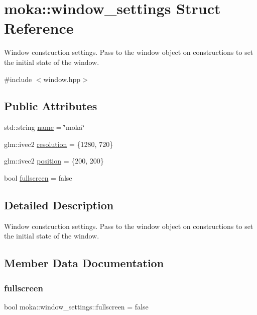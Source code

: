 \hypertarget{structmoka_1_1window__settings}{}\section{moka\+::window\+\_\+settings Struct Reference}
\label{structmoka_1_1window__settings}


Window construction settings. Pass to the window object on constructions to set the initial state of the window.  




{\ttfamily \#include $<$window.\+hpp$>$}

\subsection*{Public Attributes}
\begin{DoxyCompactItemize}
\item 
std\+::string \mbox{\hyperlink{structmoka_1_1window__settings_ad53068092b1bf791a0dfe35df846026b}{name}} = \char`\"{}moka\char`\"{}
\item 
glm\+::ivec2 \mbox{\hyperlink{structmoka_1_1window__settings_a660037db2bab0e3a2cbdf0ac65832096}{resolution}} = \{1280, 720\}
\item 
glm\+::ivec2 \mbox{\hyperlink{structmoka_1_1window__settings_a67d1e29d6707e634ee248f56edf1c2dc}{position}} = \{200, 200\}
\item 
bool \mbox{\hyperlink{structmoka_1_1window__settings_a1dbb508a1648c609d6d4f0d700f611bd}{fullscreen}} = false
\end{DoxyCompactItemize}


\subsection{Detailed Description}
Window construction settings. Pass to the window object on constructions to set the initial state of the window. 

\subsection{Member Data Documentation}
\mbox{\label{structmoka_1_1window__settings_a1dbb508a1648c609d6d4f0d700f611bd}} 
\subsubsection{\texorpdfstring{fullscreen}{fullscreen}}
{\footnotesize\ttfamily bool moka\+::window\+\_\+settings\+::fullscreen = false}

